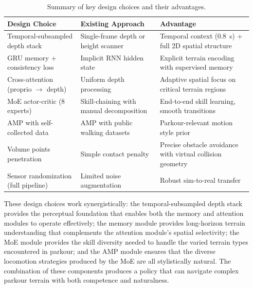 \begin{table}[t]
\centering
\caption{Summary of key design choices and their advantages.}
\label{tab:design_summary}
\footnotesize
\begin{tabular}{@{}p{3.5cm}p{4cm}p{5cm}@{}}
\toprule
\textbf{Design Choice} & \textbf{Existing Approach} & \textbf{Advantage} \\
\midrule
Temporal-subsampled depth stack & Single-frame depth or height scanner & Temporal context (0.8~s) + full 2D spatial structure \\
GRU memory + consistency loss & Implicit RNN hidden state & Explicit terrain encoding with supervised memory \\
Cross-attention (proprio $\to$ depth) & Uniform depth processing & Adaptive spatial focus on critical terrain regions \\
MoE actor-critic (8 experts) & Skill-chaining with manual decomposition & End-to-end skill learning, smooth transitions \\
AMP with self-collected data & AMP with public walking datasets & Parkour-relevant motion style prior \\
Volume points penetration & Simple contact penalty & Precise obstacle avoidance with virtual collision geometry \\
Sensor randomization (full pipeline) & Limited noise augmentation & Robust sim-to-real transfer \\
\bottomrule
\end{tabular}
\end{table}

These design choices work synergistically: the temporal-subsampled depth stack provides the perceptual foundation that enables both the memory and attention modules to operate effectively; the memory module provides long-horizon terrain understanding that complements the attention module's spatial selectivity; the MoE module provides the skill diversity needed to handle the varied terrain types encountered in parkour; and the AMP module ensures that the diverse locomotion strategies produced by the MoE are all stylistically natural. The combination of these components produces a policy that can navigate complex parkour terrain with both competence and naturalness.